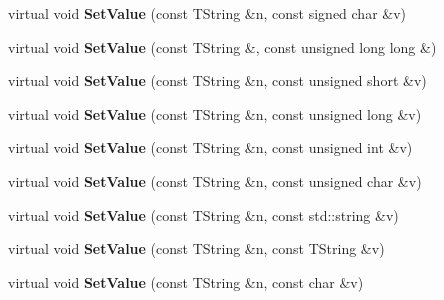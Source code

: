 \begin{DoxyCompactItemize}
\item 
\hypertarget{class_h_a_l_1_1_analysis_data_ae248b4f6c90034c9a41f8f8618ed89b8}{virtual void {\bfseries Set\-Value} (const T\-String \&n, const signed char \&v)}\label{class_h_a_l_1_1_analysis_data_ae248b4f6c90034c9a41f8f8618ed89b8}

\item 
\hypertarget{class_h_a_l_1_1_analysis_data_a0d21eebe0e1566531fa5c736f2cc6ed2}{virtual void {\bfseries Set\-Value} (const T\-String \&, const unsigned long long \&)}\label{class_h_a_l_1_1_analysis_data_a0d21eebe0e1566531fa5c736f2cc6ed2}

\item 
\hypertarget{class_h_a_l_1_1_analysis_data_a08be235fce5fd10cfafc592a2d9c1448}{virtual void {\bfseries Set\-Value} (const T\-String \&n, const unsigned short \&v)}\label{class_h_a_l_1_1_analysis_data_a08be235fce5fd10cfafc592a2d9c1448}

\item 
\hypertarget{class_h_a_l_1_1_analysis_data_af9cca2f941fef23004516aefc0d9c00d}{virtual void {\bfseries Set\-Value} (const T\-String \&n, const unsigned long \&v)}\label{class_h_a_l_1_1_analysis_data_af9cca2f941fef23004516aefc0d9c00d}

\item 
\hypertarget{class_h_a_l_1_1_analysis_data_adac44d46dc879cda67371131c18cf233}{virtual void {\bfseries Set\-Value} (const T\-String \&n, const unsigned int \&v)}\label{class_h_a_l_1_1_analysis_data_adac44d46dc879cda67371131c18cf233}

\item 
\hypertarget{class_h_a_l_1_1_analysis_data_ab3237d1010394bff323821642ea2380c}{virtual void {\bfseries Set\-Value} (const T\-String \&n, const unsigned char \&v)}\label{class_h_a_l_1_1_analysis_data_ab3237d1010394bff323821642ea2380c}

\item 
\hypertarget{class_h_a_l_1_1_analysis_data_a3fcb628c26524a1cc11db49295581d2d}{virtual void {\bfseries Set\-Value} (const T\-String \&n, const std\-::string \&v)}\label{class_h_a_l_1_1_analysis_data_a3fcb628c26524a1cc11db49295581d2d}

\item 
\hypertarget{class_h_a_l_1_1_analysis_data_acb8dd69db78b9d748ad4966584c7fa78}{virtual void {\bfseries Set\-Value} (const T\-String \&n, const T\-String \&v)}\label{class_h_a_l_1_1_analysis_data_acb8dd69db78b9d748ad4966584c7fa78}

\item 
\hypertarget{class_h_a_l_1_1_analysis_data_a7ffd3d35192f72eeadb3274a9bf8694d}{virtual void {\bfseries Set\-Value} (const T\-String \&n, const char \&v)}\label{class_h_a_l_1_1_analysis_data_a7ffd3d35192f72eeadb3274a9bf8694d}


\end{DoxyCompactItemize}
